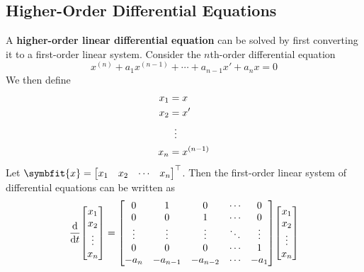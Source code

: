\documentclass{article}
\begin{document}
	\subsection{Higher-Order Differential Equations}
	\begin{theorem}
		A \textbf{higher-order linear differential equation} can be solved by first converting it to a first-order linear system. Consider the $n$th-order differential equation
		\begin{equation*}
			x^{\left( n \right)} + a_1 x^{\left( n-1 \right)} + \cdots + a_{n-1} x' + a_n x = 0
		\end{equation*}
		We then define
		\begin{align*}
			x_1 &= x \\
			x_2 &= x' \\
			&\vdotswithin{=} \\
			x_n &= x^{\left( n-1 \right)}
		\end{align*}
		Let $\symbfit{x}=\mqty[x_1 & x_2 & \cdots & x_n]^\top$. Then the first-order linear system of differential equations can be written as
		\begin{equation*}
			\dv{t}\mqty[
				x_1 \\
				x_2 \\
				\vdotswithin{x_3} \\
				x_n	
			] = \mqty[
				0 & 1 & 0 & \cdots & 0 \\
				0 & 0 & 1 & \cdots & 0 \\
				\vdots & \vdots & \vdots & \ddots & \vdots \\
				0 & 0 & 0 & \cdots & 1 \\
				-a_n & -a_{n-1} & -a_{n-2} & \cdots & -a_1
			] \mqty[
				x_1 \\
				x_2 \\
				\vdotswithin{x_3} \\
				x_n	
			]
		\end{equation*}
	\end{theorem}
\newpage

\listoffigures 

\newpage

\nocite{*}



\end{document}
